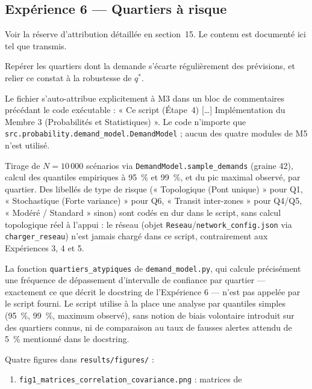 \documentclass[11pt,a4paper]{article}
\begin{document}
\subsection{Expérience 6 --- Quartiers à risque}

Voir la réserve d'attribution détaillée en section~15. Le contenu est
documenté ici tel que transmis.

\begin{description}[style=nextline]
  \item[Objectif déclaré (docstring)] Repérer les quartiers dont la demande
  s'écarte régulièrement des prévisions, et relier ce constat à la
  robustesse de $q^*$.
  \item[Attribution réelle du code] Le fichier s'auto-attribue explicitement
  à M3 dans un bloc de commentaires précédant le code exécutable : « Ce
  script (Étape~4) [\ldots] Implémentation du Membre 3 (Probabilités et
  Statistiques) ». Le code n'importe que
  \texttt{src.probability.demand\_model.DemandModel} ; aucun des quatre
  modules de M5 n'est utilisé.
  \item[Méthode réellement implémentée] Tirage de $N = 10\,000$ scénarios
  via \texttt{DemandModel.sample\_demands} (graine 42), calcul des
  quantiles empiriques à 95~\% et 99~\%, et du pic maximal observé, par
  quartier. Des libellés de type de risque (« Topologique (Pont unique) »
  pour Q1, « Stochastique (Forte variance) » pour Q6, « Transit inter-zones »
  pour Q4/Q5, « Modéré / Standard » sinon) sont codés en dur dans le script,
  sans calcul topologique réel à l'appui : le réseau (objet
  \texttt{Reseau}/\texttt{network\_config.json} via \texttt{charger\_reseau})
  n'est jamais chargé dans ce script, contrairement aux Expériences 3, 4 et
  5.
  \item[Écart avec la méthode annoncée] La fonction
  \texttt{quartiers\_atypiques} de \texttt{demand\_model.py}, qui calcule
  précisément une fréquence de dépassement d'intervalle de confiance par
  quartier --- exactement ce que décrit le docstring de l'Expérience 6 ---
  n'est pas appelée par le script fourni. Le script utilise à la place une
  analyse par quantiles simples (95~\%, 99~\%, maximum observé), sans
  notion de biais volontaire introduit sur des quartiers connus, ni de
  comparaison au taux de fausses alertes attendu de 5~\% mentionné dans le
  docstring.
  \item[Sorties produites] Quatre figures dans \texttt{results/figures/} :
  \begin{enumerate}
    \item \texttt{fig1\_matrices\_correlation\_covariance.png} : matrices de

\end{enumerate}
\end{description}
\end{document}
